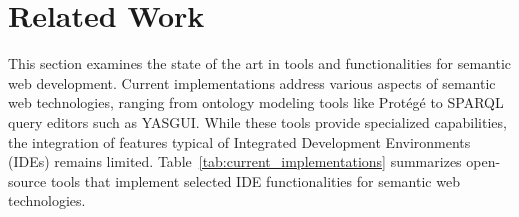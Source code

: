 %
%
%
%
%
%
%
%
%
%
%
%
%
%



\section{Related Work}%
\label{sec:related_work}

This section examines the state of the art in tools and functionalities for semantic web development. 
Current implementations address various aspects of semantic web technologies, ranging from ontology modeling tools like Protégé to SPARQL query editors such as YASGUI.
While these tools provide specialized capabilities, the integration of features typical of Integrated Development Environments (IDEs) remains limited. 
Table~\ref{tab:current_implementations} summarizes open-source tools that implement selected IDE functionalities for semantic web technologies.

